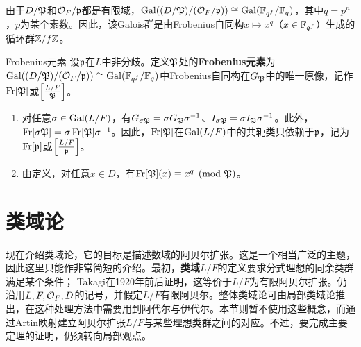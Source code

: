由于$D/\mathfrak{P}$和$\mathcal O_F/\mathfrak{p}$都是有限域，$\operatorname{Gal}((D/\mathfrak{P})/(\mathcal O_F/\mathfrak{p}))\cong\operatorname{Gal}(\mathbb{F}_{q^f}/\mathbb{F}_q)$，其中$q=p^n$，$p$为某个素数。因此，该Galois群是由Frobenius自同构$x\mapsto x^q$（$x\in\mathbb{F}_{q^f}$）生成的循环群$\mathbb{Z}/f\mathbb{Z}$。
\begin{definition}{Frobenius元素}\label{L2S2O6}
设$\mathfrak{p}$在$L$中非分歧。定义$\mathfrak{P}$处的\textbf{Frobenius元素}为$\operatorname{Gal}((D/\mathfrak{P})/(\mathcal O_F/\mathfrak{p}))\cong\operatorname{Gal}(\mathbb{F}_{q^f}/\mathbb{F}_q)$中Frobenius自同构在$G_{\mathfrak{P}}$中的唯一原像，记作$\operatorname{Fr}[\mathfrak{P}]$或$\left[\frac{L/F}{\mathfrak{P}}\right]$。
\end{definition}
\begin{note}[L2S2O7]
\begin{enumerate}
\item 对任意$\sigma\in\operatorname{Gal}(L/F)$，有$G_{\sigma\mathfrak{P}}=\sigma G_{\mathfrak{P}}\sigma^{-1}$、$I_{\sigma\mathfrak{P}}=\sigma I_{\mathfrak{P}}\sigma^{-1}$。此外，$\operatorname{Fr}[\sigma\mathfrak{P}]=\sigma\operatorname{Fr}[\mathfrak{P}]\sigma^{-1}$。因此，$\operatorname{Fr}[\mathfrak{P}]$在$\operatorname{Gal}(L/F)$中的共轭类只依赖于$\mathfrak{p}$，记为$\operatorname{Fr}[\mathfrak{p}]$或$\left[\frac{L/F}{\mathfrak{p}}\right]$。
\item 由定义，对任意$x\in D$，有$\operatorname{Fr}[\mathfrak{P}](x)\equiv x^q\pmod{\mathfrak{P}}$。
\end{enumerate}
\end{note}
\section{类域论}\label{L2S3}
现在介绍类域论，它的目标是描述数域的阿贝尔扩张。这是一个相当广泛的主题，因此这里只能作非常简短的介绍。最初，\textbf{类域}$L/F$的定义要求分式理想的同余类群满足某个条件；
Takagi在1920年前后证明，这等价于$L/F$为有限阿贝尔扩张。仍沿用$L,F,\mathcal O_F,D$的记号，并假定$L/F$有限阿贝尔。整体类域论可由局部类域论推出，在这种处理方法中需要用到阿代尔与伊代尔。本节则暂不使用这些概念，而通过Artin映射建立阿贝尔扩张$L/F$与某些理想类群之间的对应。不过，要完成主要定理的证明，仍须转向局部观点。

